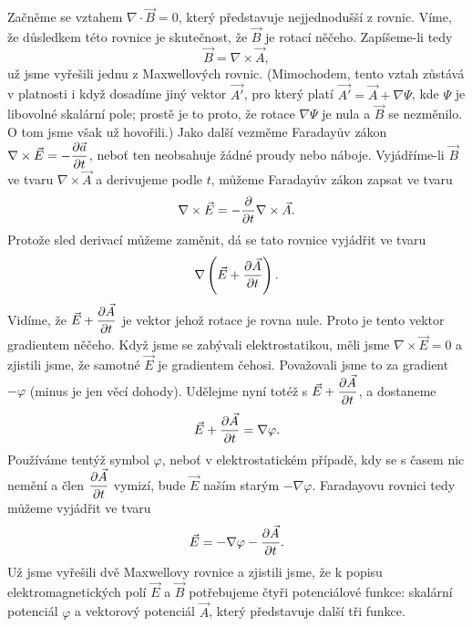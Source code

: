   Začněme se vztahem \(\nabla\cdot\vec{B}=0\), který představuje nejjednodušší z rovnic. Víme, že 
  důsledkem této rovnice je skutečnost, že \(\vec{B}\) je rotací něčeho. Zapíšeme-li tedy
  \begin{equation}\label{fyz:eq452}
    \vec{B} = \nabla\times\vec{A},
  \end{equation}
  už jsme vyřešili jednu z Maxwellových rovnic. (Mimochodem, tento vztah zůstává v platnosti i když 
  dosadíme jiný vektor \(\vec{A'}\), pro který platí \(\vec{A'} =\vec{A} +\nabla\Psi\), kde 
  \(\Psi\) je libovolné skalární pole; prostě je to proto, že rotace \(\nabla\Psi\) je nula a 
  \(\vec{B}\) se nezměnilo. O tom jsme však už hovořili.) Jako další vezměme Faradayův zákon 
  \(\nabla\times\vec{E} = - \dfrac{\partial \vec{a}}{\partial t}\), neboť ten neobsahuje žádné proudy nebo náboje. 
  Vyjádříme-li \(\vec{B}\) ve tvaru \(\nabla\times\vec{A}\) a derivujeme podle \(t\), můžeme 
  Faradayův zákon zapsat ve tvaru
  \begin{equation*}
    \nabla\times\vec{E} = - \dfrac{\partial }{\partial t}\nabla\times\vec{A}.
  \end{equation*}
  Protože sled derivací můžeme zaměnit, dá se tato rovnice vyjádřit ve tvaru
  \begin{equation}\label{fyz:eq453}
    \nabla\left(\vec{E} + \dfrac{\partial \vec{A}}{\partial t}\right).
  \end{equation}
  Vidíme, že \(\vec{E} + \dfrac{\partial \vec{A}}{\partial t}\) je vektor jehož rotace je rovna nule. Proto je tento 
  vektor gradientem něčeho. Když jsme se zabývali elektrostatikou, měli jsme \(\nabla\times\vec{E} 
  = 0\) a zjistili jsme, že samotné \(\vec{E}\) je gradientem čehosi. Považovali jsme to za 
  gradient \(-\varphi\) (minus je jen věcí dohody). Udělejme nyní totéž s \(\vec{E} + 
  \dfrac{\partial \vec{A}}{\partial t}\), a dostaneme
  \begin{equation}\label{fyz:eq454}
    \vec{E} + \dfrac{\partial \vec{A}}{\partial t} = \nabla\varphi.
  \end{equation}  
  Používáme tentýž symbol \(\varphi\), neboť v elektrostatickém případě, kdy se s časem nic nemění 
  a člen \(\dfrac{\partial \vec{A}}{\partial t}\) vymizí, bude \(\vec{E}\) naším starým \(-\nabla\varphi\). Faradayovu 
  rovnici tedy můžeme vyjádřit ve tvaru
  \begin{equation}\label{fyz:eq455}
    \vec{E} = - \nabla\varphi - \dfrac{\partial \vec{A}}{\partial t}.
  \end{equation} 
  Už jsme vyřešili dvě Maxwellovy rovnice a zjistili jsme, že k popisu elektromagnetických polí 
  \(\vec{E}\) a \(\vec{B}\) potřebujeme čtyři potenciálové funkce: skalární potenciál \(\varphi\) a 
  vektorový potenciál \(\vec{A}\), který představuje další tři funkce.
  
